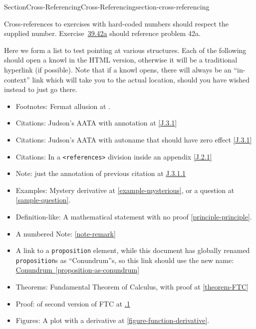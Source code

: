 \documentclass[twoside,10pt,]{article}
\newcommand{\xreffont}{\relax}
\newcommand{\mono}[1]{\texttt{#1}}
\numberwithin{equation}{section}
\begin{document}
\begin{sectionptx}{Section}{Cross-Referencing}{}{Cross-Referencing}{}{}{section-cross-referencing}
\par
Cross-references to exercises with hard-coded numbers should respect the supplied number.  Exercise~\hyperlink{exercise-with-hardcoded-number}{{\xreffont 39.42a}} should reference problem 42a.%
\par
Here we form a list to test pointing at various structures.  Each of the following should open a knowl in the HTML version, otherwise it will be a traditional hyperlink (if possible).  Note that if a knowl opens, there will always be an ``in-context'' link which will take you to the actual location, should you have  wished instead to just go there.%
\begin{itemize}[label=\textbullet]
\item{}Footnotes: Fermat allusion at \hyperref[footnote-fermat]{{\xreffont 2.1}}.%
\item{}Citations: Judson's AATA with annotation at \hyperlink{biblio-judson-AATA}{[{\xreffont J.3.1}]}%
\item{}Citations: Judson's AATA with autoname that should have zero effect \hyperlink{biblio-judson-AATA}{[{\xreffont J.3.1}]}%
\item{}Citations: In a \mono{<references>} division inside an appendix \hyperlink{biblio-strang-article-uno}{[{\xreffont J.2.1}]}%
\item{}Note: just the annotation of previous citation at \hyperlink{note-judson-AATA}{{\xreffont J.3.1.1}}%
\item{}Examples: Mystery derivative at \hyperref[example-mysterious]{{\xreffont\ref{example-mysterious}}}, or a question at \hyperref[sample-question]{{\xreffont\ref{sample-question}}}.%
\item{}Definition-like: A mathematical statement with no proof \hyperref[principle-principle]{{\xreffont\ref{principle-principle}}}.%
\item{}A numbered Note: \hyperref[note-remark]{{\xreffont\ref{note-remark}}}%
\item{}A link to a \mono{proposition} element, while this document has globally renamed \mono{proposition}s as ``Conundrum''s, so this link should use the new name: \hyperref[proposition-as-conundrum]{Conundrum~{\xreffont\ref{proposition-as-conundrum}}}%
\item{}Theorems: Fundamental Theorem of Calculus, with proof at \hyperref[theorem-FTC]{{\xreffont\ref{theorem-FTC}}}%
\item{}Proof: of second version of FTC at \hyperlink{proof-FTC-corollary}{{\xreffont 4.1.1}}%
\item{}Figures: A plot with a derivative at \hyperref[figure-function-derivative]{{\xreffont\ref{figure-function-derivative}}}.%

\end{itemize}
\end{sectionptx}
\end{document}
